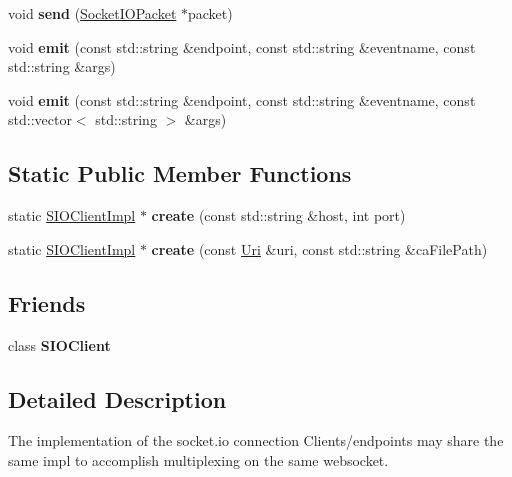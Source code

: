 \begin{DoxyCompactItemize}
void {\bfseries send} (\hyperlink{classnetwork_1_1SocketIOPacket}{Socket\+I\+O\+Packet} $\ast$packet)
\item 
\mbox{\label{classnetwork_1_1SIOClientImpl_a6c99989b74064a444178db0f05674eae}} 
void {\bfseries emit} (const std\+::string \&endpoint, const std\+::string \&eventname, const std\+::string \&args)
\item 
\mbox{\label{classnetwork_1_1SIOClientImpl_aff97e1ef160d2e403846161793daf062}} 
void {\bfseries emit} (const std\+::string \&endpoint, const std\+::string \&eventname, const std\+::vector$<$ std\+::string $>$ \&args)
\end{DoxyCompactItemize}
\subsection*{Static Public Member Functions}
\begin{DoxyCompactItemize}
\item 
\mbox{\label{classnetwork_1_1SIOClientImpl_a1ca80160a7bdac5d2c382d61bf21ba47}} 
static \hyperlink{classnetwork_1_1SIOClientImpl}{S\+I\+O\+Client\+Impl} $\ast$ {\bfseries create} (const std\+::string \&host, int port)
\item 
\mbox{\label{classnetwork_1_1SIOClientImpl_a24cf89a2cb8b56e1e2a08ea73d2f0bf2}} 
static \hyperlink{classnetwork_1_1SIOClientImpl}{S\+I\+O\+Client\+Impl} $\ast$ {\bfseries create} (const \hyperlink{classnetwork_1_1Uri}{Uri} \&uri, const std\+::string \&ca\+File\+Path)
\end{DoxyCompactItemize}
\subsection*{Friends}
\begin{DoxyCompactItemize}
\item 
\mbox{\label{classnetwork_1_1SIOClientImpl_a8dd8e0c3b9d21c219011e159d502fec9}} 
class {\bfseries S\+I\+O\+Client}
\end{DoxyCompactItemize}


\subsection{Detailed Description}
The implementation of the socket.\+io connection Clients/endpoints may share the same impl to accomplish multiplexing on the same websocket. 

